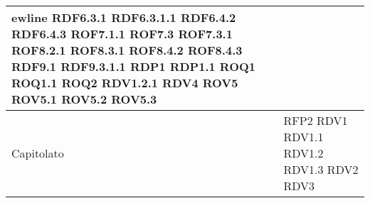 \begin{center}
\begin{longtable}{| p{4cm} | p{4cm} |}
ewline RDF6.3.1 \newline RDF6.3.1.1 \newline RDF6.4.2 \newline RDF6.4.3 \newline ROF7.1.1 \newline ROF7.3 \newline ROF7.3.1 \newline ROF8.2.1 \newline ROF8.3.1 \newline ROF8.4.2 \newline ROF8.4.3 \newline RDF9.1 \newline RDF9.3.1.1 \newline RDP1 \newline RDP1.1 \newline ROQ1 \newline ROQ1.1 \newline ROQ2 \newline RDV1.2.1 \newline RDV4 \newline ROV5 \newline ROV5.1 \newline ROV5.2 \newline ROV5.3 \\
		\hline
		Capitolato  &  RFP2 \newline RDV1 \newline RDV1.1 \newline RDV1.2 \newline RDV1.3 \newline RDV2 \newline RDV3 \\
		\hline


\end{longtable}
\end{center}
